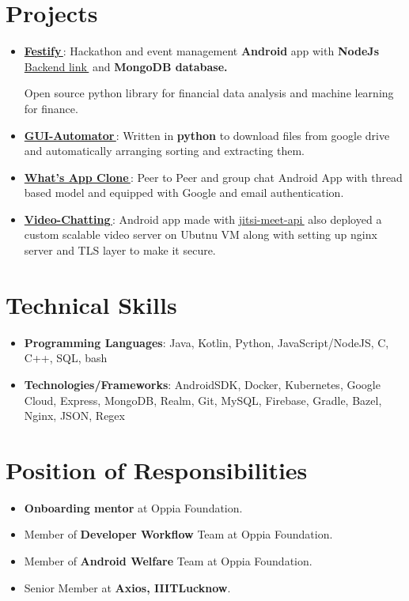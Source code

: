 \documentclass[letterpaper,11pt]{article}
\let\orighref\href
\renewcommand{\href}[2]{\orighref{#1}{#2\,\faExternalLink}}
\newcommand{\resumeItem}[2]{
  \item\small{
    \textbf{#1}{: #2 \vspace{-2pt}}
  }
}
\newcommand{\resumeSubHeadingListStart}{\begin{itemize}[leftmargin=*]}
\newcommand{\resumeSubHeadingListEnd}{\end{itemize}}
\begin{document}
\section{Projects}
\resumeSubHeadingListStart
\resumeItem{\href{https://github.com/yash10019coder/festify-android}{Festify}}{Hackathon and event management \textbf{Android} app with \textbf{NodeJs} \href{https://github.com/yash10019coder/festify-node-server}{Backend link} and \textbf{MongoDB database.}}
{Open source python library for financial data analysis and machine learning for finance.}
\resumeItem{\href{https://github.com/yash10019coder/Gui-Automator}{GUI-Automator}}
{Written in \textbf{python} to download files from google drive and automatically arranging sorting and extracting them.}
\resumeItem{\href{https://github.com/yash10019coder/Whats-App}{What's App Clone}}
{Peer to Peer and group chat Android App with thread based model and equipped with Google and email authentication.}
\resumeItem{\href{https://github.com/yash10019coder/Video-Chatting}{Video-Chatting}}
{Android app made with \href{https://github.com/jitsi/jitsi-meet}{jitsi-meet-api} also deployed a custom scalable video server on Ubutnu VM along with setting up nginx server and TLS layer to make it secure.}
\resumeSubHeadingListEnd

%
\section{Technical Skills}
\resumeSubHeadingListStart
\item{
            \textbf{Programming Languages}{: Java, Kotlin, Python, JavaScript/NodeJS, C, C++, SQL, bash}
      }
\item{
            \textbf{Technologies/Frameworks}{: AndroidSDK, Docker, Kubernetes, Google Cloud, Express, MongoDB, Realm, Git, MySQL, Firebase, Gradle, Bazel, Nginx, JSON, Regex}
      }
\resumeSubHeadingListEnd

\section{Position of Responsibilities}
\begin{itemize}
  \item \textbf{Onboarding mentor} at Oppia Foundation.
  \item Member of \textbf{Developer Workflow} Team at Oppia Foundation.
  \item Member of \textbf{Android Welfare} Team at Oppia Foundation.
  \item Senior Member at \textbf{Axios, IIITLucknow}.
\end{itemize}
\end{document}
